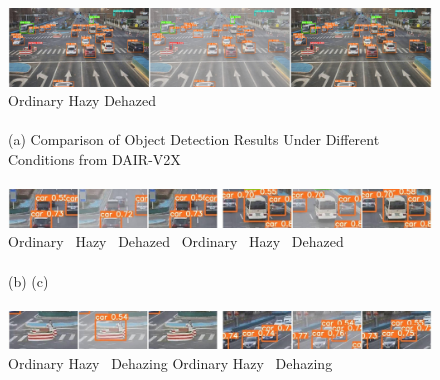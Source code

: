 \documentclass[lettersize,journal]{IEEEtran}
\begin{document}
\begin{figure}[pht]
    \centering
    
    \includegraphics[width=\textwidth]{pic2.jpg}
    Ordinary \qquad\qquad\qquad\qquad\qquad\qquad\qquad\quad Hazy \qquad\qquad\qquad\qquad\qquad\qquad\qquad Dehazed \\

    \quad \\
    
    (a) Comparison of Object Detection Results Under Different Conditions from DAIR-V2X\\

    \quad \\
    
    \includegraphics[width=\textwidth]{pic3.jpg}
    Ordinary \qquad\qquad\quad\, Hazy \qquad\qquad\quad\ Dehazed 
    \qquad \qquad \,
    Ordinary \qquad\qquad\quad\, Hazy \qquad\qquad\quad\ Dehazed\\

    \quad \\
    
    (b) \qquad\qquad\qquad\qquad\qquad\qquad\qquad\qquad\qquad\qquad\qquad\qquad\quad (c) \\

    \quad \\

    \includegraphics[width=\textwidth]{pic4.jpg}
    Ordinary \qquad\qquad\quad Hazy \qquad\qquad\quad\ Dehazing 
    \qquad \qquad \quad
    Ordinary \qquad\qquad\quad Hazy \qquad\qquad\quad\ Dehazing\\
    
    \quad \\
    

\end{figure}
\end{document}
